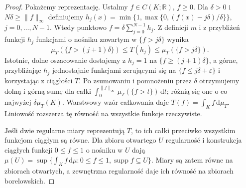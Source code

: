 \documentclass[11pt,a4paper]{article}
\numberwithin{equation}{section}
\theoremstyle{plain}
\theoremstyle{definition}
\theoremstyle{remark}
\newcommand{\R}{\mathbb R}
\begin{document}
\begin{proof}
Pokażemy reprezentację. Ustalmy $f\in C(K;\R)$, $f\ge0$.
Dla $\delta>0$ i $N\delta\ge\|f\|_\infty$ definiujemy
$h_j(x)=\min\{1,\max\{0,(f(x)-j\delta)/\delta\}\}$,
$j=0,\dots,N-1$. Wtedy punktowo
$f=\delta\sum_{j=0}^{N-1}h_j$. Z definicji $m$
i z przybliżeń funkcji $h_j$ funkcjami o nośniku
zawartym w $\{f>j\delta\}$ wynika
\[
 \mu_T(\{f>(j+1)\delta\})\le T(h_j)
 \le\mu_T(\{f>j\delta\}).
\]
Istotnie, dolne oszacowanie dostajemy z $h_j=1$
na $\{f\ge(j+1)\delta\}$, a górne, przybliżając $h_j$
jednostajnie funkcjami zerującymi się na
$\{f\le j\delta+\varepsilon\}$ i korzystając z
ciągłości $T$. Po zsumowaniu i pomnożeniu przez $\delta$
otrzymujemy dolną i górną sumę dla całki
$\int_0^{\|f\|_\infty}\mu_T(\{f>t\})\,\mathrm dt$;
różnią się one o co najwyżej $\delta\mu_T(K)$.
Warstwowy wzór całkowania daje
$T(f)=\int_Kf\,\mathrm d\mu_T$. Liniowość rozszerza
tę równość na wszystkie funkcje rzeczywiste.

Jeśli dwie regularne miary reprezentują $T$, to ich całki
przeciwko wszystkim funkcjom ciągłym są równe.
Dla zbioru otwartego $U$ regularność i konstrukcja ciągłych
funkcji $0\le f\le1$ o nośniku w $U$ dają
$\mu(U)=\sup\{\int_Kf\,\mathrm d\mu:0\le f\le1,
\operatorname{supp}f\subseteq U\}$.
Miary są zatem równe na zbiorach otwartych,
a zewnętrzna regularność daje ich równość na zbiorach borelowskich.
\end{proof}
\end{document}
